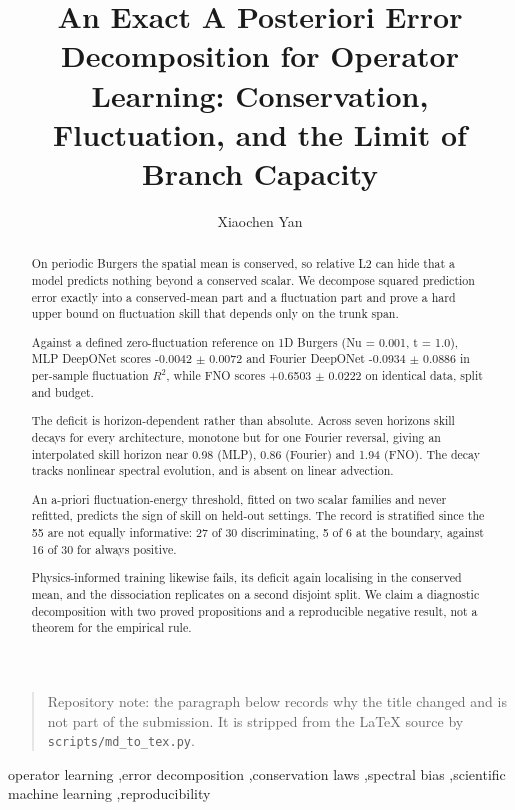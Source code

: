 \documentclass[preprint,12pt]{elsarticle}
\begin{document}
\begin{frontmatter}
\title{An Exact A Posteriori Error Decomposition for Operator Learning: Conservation, Fluctuation, and the Limit of Branch Capacity}

\author{Xiaochen Yan}


\address{Independent Researcher, Shenzhen, China. ORCID: 0009-0002-9280-4323}


\begin{quote}
Repository note: the paragraph below records why the title changed and is not part of the submission. It is stripped from the LaTeX source by \texttt{scripts/md\_to\_tex.py}.
\end{quote}







\begin{abstract}

On periodic Burgers the spatial mean is conserved, so relative L2 can hide that a model predicts nothing beyond a conserved scalar. We decompose squared prediction error exactly into a conserved-mean part and a fluctuation part and prove a hard upper bound on fluctuation skill that depends only on the trunk span.

Against a defined zero-fluctuation reference on 1D Burgers (Nu = 0.001, t = 1.0), MLP DeepONet scores -0.0042 $\pm$ 0.0072 and Fourier DeepONet -0.0934 $\pm$ 0.0886 in per-sample fluctuation $R^2$, while FNO scores +0.6503 $\pm$ 0.0222 on identical data, split and budget.

The deficit is horizon-dependent rather than absolute. Across seven horizons skill decays for every architecture, monotone but for one Fourier reversal, giving an interpolated skill horizon near 0.98 (MLP), 0.86 (Fourier) and 1.94 (FNO). The decay tracks nonlinear spectral evolution, and is absent on linear advection.

An a-priori fluctuation-energy threshold, fitted on two scalar families and never refitted, predicts the sign of skill on held-out settings. The record is stratified since the 55 are not equally informative: 27 of 30 discriminating, 5 of 6 at the boundary, against 16 of 30 for always positive.

Physics-informed training likewise fails, its deficit again localising in the conserved mean, and the dissociation replicates on a second disjoint split. We claim a diagnostic decomposition with two proved propositions and a reproducible negative result, not a theorem for the empirical rule.

\end{abstract}
\begin{keyword}
operator learning \sep error decomposition \sep conservation laws \sep spectral bias \sep scientific machine learning \sep reproducibility
\end{keyword}
\end{frontmatter}
\end{document}
